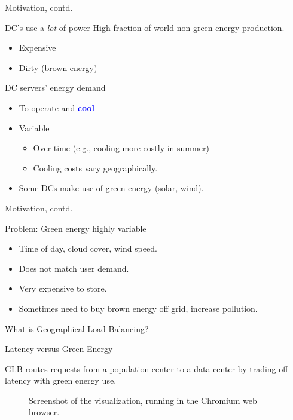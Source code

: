 \documentclass[xcolor=dvipsnames]{beamer}
\newcommand{\bi}{\begin{itemize}}
\newcommand{\ei}{\end{itemize}}
\newcommand{\itm}{\item}
\begin{document}
\begin{frame}{Motivation, contd.}
	\begin{block}{DC's use a {\it lot} of power} 
		High fraction of world non-green energy production.
		\bi
			\itm {Expensive}
			\itm {Dirty (brown energy)}
		\ei	
	\end{block}

	\begin{block}{DC servers' energy demand} \vspace{-1mm}
		\begin{itemize}
		          \item{To operate and \textbf{\textcolor{blue}{cool}}}
			\item{Variable}
				\begin{itemize} 
					\itm {Over time (e.g., cooling more costly in summer)}  %
					\item{Cooling costs vary geographically.}
		 		\end{itemize}				
			\item{Some DCs make use of green energy (solar, wind).}
		\end{itemize}
 	\end{block}
\end{frame}


\begin{frame}{Motivation, contd.}

	\begin{block}{Problem: Green energy highly variable} 
		\begin{itemize}
			 \item{Time of day, cloud cover, wind speed.}
			 \item{Does not match user demand. }
			\item{Very expensive to store.}
			\item{Sometimes need to buy brown energy off grid, increase pollution.}
		\end{itemize}
	\end{block}
\end{frame}

\begin{frame}{What is Geographical Load Balancing?}   
\begin{block}{Latency versus Green Energy}

GLB routes requests from a population center to a data center by trading off latency with green energy use. 

\end{block}
\vspace{-7mm}
\begin{figure}
\centering
{}
\caption{Screenshot of the visualization, running in the Chromium web browser.}
\end{figure}

\end{frame}
\end{document}

